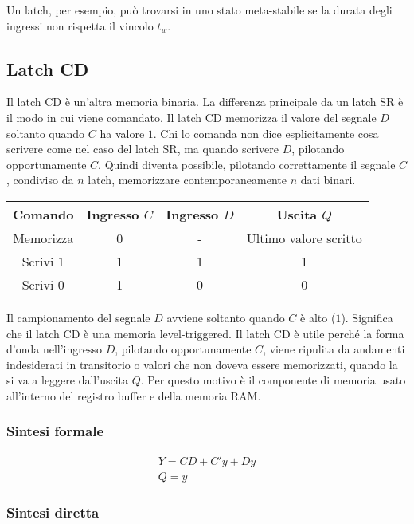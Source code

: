 \documentclass{subfiles}
\begin{document}
\noindent
Un latch, per esempio, può trovarsi in uno stato meta-stabile se la durata degli ingressi non rispetta il vincolo $t_w$.

\subsection{Latch CD}

Il latch CD è un'altra memoria binaria.
La differenza principale da un latch SR è il modo in cui viene comandato.
Il latch CD memorizza il valore del segnale $D$ soltanto quando $C$ ha valore $1$.
Chi lo comanda non dice esplicitamente cosa scrivere come nel caso del latch SR, ma quando scrivere $D$, pilotando opportunamente $C$.
Quindi diventa possibile, pilotando correttamente il segnale $C$, condiviso da $n$ latch, memorizzare contemporaneamente $n$ dati binari.

\begin{center}
\begin{tabular}{ |c|c|c|c| }
\hline
Comando & Ingresso $C$ & Ingresso $D$ & Uscita $Q$  \\
\hline
\hline
Memorizza & 0 & - & Ultimo valore scritto \\
Scrivi $1$ & 1 & 1 & 1 \\
Scrivi $0$ & 1 & 0 & 0 \\
\hline
\end{tabular}
\end{center}

\noindent
Il campionamento del segnale $D$ avviene soltanto quando $C$ è alto ($1$).
Significa che il latch CD è una memoria level-triggered.
Il latch CD è utile perché la forma d'onda nell'ingresso $D$, pilotando opportunamente $C$, viene ripulita da andamenti indesiderati in transitorio o valori che non doveva essere memorizzati, quando la si va a leggere dall'uscita $Q$.
Per questo motivo è il componente di memoria usato all'interno del registro buffer e della memoria RAM.

\subsubsection{Sintesi formale}

$$
\begin{matrix}
Y=CD+C'y+Dy\\
Q=y
\end{matrix}
$$

\subsubsection{Sintesi diretta}
\end{document}
